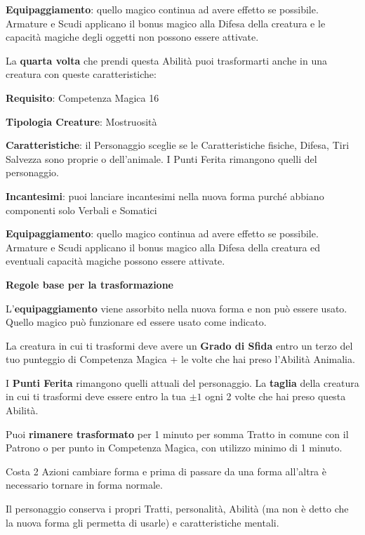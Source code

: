 \begin{multicols}{2}
\textbf{Equipaggiamento}: quello magico continua ad avere effetto se possibile. Armature e Scudi applicano il bonus magico alla Difesa della creatura e le capacità magiche degli oggetti non possono essere attivate.

\medskip

La \textbf{quarta volta} che prendi questa Abilità puoi trasformarti anche in una creatura con queste caratteristiche:

\medskip

\textbf{Requisito}: Competenza Magica 16

\textbf{Tipologia Creature}: Mostruosità

\textbf{Caratteristiche}: il Personaggio sceglie se le Caratteristiche fisiche, Difesa, Tiri Salvezza sono proprie o dell'animale. I Punti Ferita rimangono quelli del personaggio.

\textbf{Incantesimi}: puoi lanciare incantesimi nella nuova forma purché abbiano componenti solo Verbali e Somatici

\textbf{Equipaggiamento}: quello magico continua ad avere effetto se possibile. Armature e Scudi applicano il bonus magico alla Difesa della creatura ed eventuali capacità magiche possono essere attivate.

\medskip

\textbf{Regole base per la trasformazione}

\medskip

L'\textbf{equipaggiamento} viene assorbito nella nuova forma e non può essere usato. Quello magico può funzionare ed essere usato come indicato.

La creatura in cui ti trasformi deve avere un \textbf{Grado di Sfida} entro un terzo del tuo punteggio di Competenza Magica + le volte che hai preso l'Abilità Animalia.

I \textbf{Punti Ferita} rimangono quelli attuali del personaggio. La \textbf{taglia} della creatura in cui ti trasformi deve essere entro la tua $\pm 1$ ogni 2 volte che hai preso questa Abilità.

Puoi \textbf{rimanere trasformato} per 1 minuto per somma Tratto in comune con il Patrono  o per punto in Competenza Magica, con utilizzo minimo di 1 minuto.

Costa 2 Azioni cambiare forma e prima di passare da una forma all'altra è necessario tornare in forma normale.

Il personaggio conserva i propri Tratti, personalità, Abilità (ma non è detto che la nuova forma gli permetta di usarle) e caratteristiche mentali.


\end{multicols}
